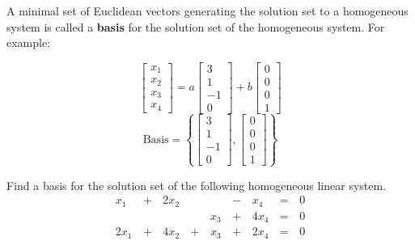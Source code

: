 \begin{applicationActivities}{3}{5}
\begin{definition}
  A minimal set of Euclidean vectors generating the solution set to a
  homogeneous system is called a \textbf{basis} for the solution
  set of the homogeneous system. For example:
  \begin{multicols}{2}\noindent
  \[
    \begin{bmatrix}
      x_1 \\
      x_2 \\
      x_3 \\
      x_4
    \end{bmatrix}=
    a\begin{bmatrix}
      3 \\
      1 \\
      -1 \\
      0
    \end{bmatrix}+
    b\begin{bmatrix}
      0 \\
      0 \\
      0 \\
      1
    \end{bmatrix}
  \]
  \[
    \textrm{Basis}=\left\{
    \begin{bmatrix}
      3 \\
      1 \\
      -1 \\
      0
    \end{bmatrix},
    \begin{bmatrix}
      0 \\
      0 \\
      0 \\
      1
    \end{bmatrix}\right\}
  \]
  \end{multicols}
\end{definition}

\begin{activity}{10}
  Find a basis for the solution set of the following homogeneous linear
  system.
  \begin{alignat*}{5}
    x_1 &\,+\,& 2x_2 &\, \,&     &\,-\,&  x_4 &\,=\,& 0 \\
        &\, \,&      &\, \,& x_3 &\,+\,& 4x_4 &\,=\,& 0 \\
   2x_1 &\,+\,& 4x_2 &\,+\,& x_3 &\,+\,& 2x_4 &\,=\,& 0 \\
  \end{alignat*}
\end{activity}




\end{applicationActivities}
